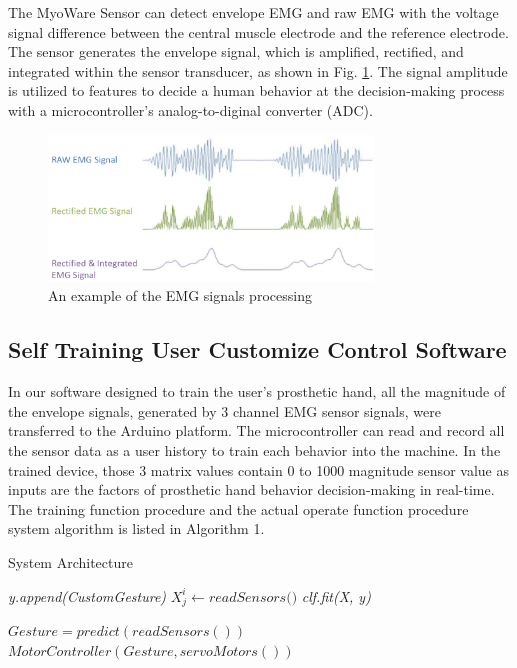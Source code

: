 \documentclass[conference]{IEEEtran}
\begin{document}
The MyoWare Sensor can detect envelope EMG and raw EMG with the voltage signal difference between the central muscle electrode and the reference electrode. The sensor generates the envelope signal, which is amplified, rectified, and integrated within the sensor transducer, as shown in Fig. \ref{signal}. The signal amplitude is utilized to features to decide a human behavior at the decision-making process with a microcontroller's analog-to-diginal converter (ADC).

\begin{figure}[h]
  \centering
  \includegraphics[width=3.4in]{signals.png}
  \caption{An example of the EMG signals processing}
  \label{signal}
\end{figure}


\subsection{Self Training User Customize Control Software}

In our software designed to train the user's prosthetic hand, all the magnitude of the envelope signals, generated by 3 channel EMG sensor signals, were transferred to the Arduino platform. The microcontroller can read and record all the sensor data as a user history to train each behavior into the machine. In the trained device, those 3 matrix values contain 0 to 1000 magnitude sensor value as inputs are the factors of prosthetic hand behavior decision-making in real-time.
The training function procedure and the actual operate function procedure system algorithm is listed in Algorithm 1.

\begin{algorithm}
\caption{System Architecture}
\label{alg:sysArch}
\begin{algorithmic}[1]

\State \textit{y.append(CustomGesture)}
        \State $ \textit{$X_{j}^i$} \gets \textit{readSensors()}$
        \EndFor
    \EndFor
\State \textit{clf.fit(X, y)}
\EndProcedure

\State \textit{ $Gesture = predict(readSensors()) $}
\State \textit{ $MotorController(Gesture, servoMotors())$ }
\EndWhile\label{endwhile}
\EndProcedure
\end{algorithmic}
\end{algorithm}
\end{document}
